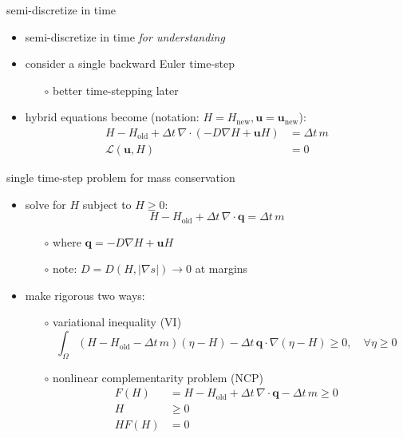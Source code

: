 \documentclass[hide notes,intlimits,usenames,dvipsnames]{beamer}
\newcommand{\Div}{\nabla\cdot}
\newcommand{\grad}{\nabla}
\begin{document}
\begin{frame}{semi-discretize in time}

\begin{itemize}
\item semi-discretize in time \emph{for understanding}
\item consider a single backward Euler time-step
    \begin{itemize}
    \item[$\circ$] better time-stepping later
    \end{itemize}
\item hybrid equations become (notation: $H=H_{\mathrm{new}}, \mathbf{u}=\mathbf{u}_{\mathrm{new}}$):
        \begin{align*}
        H - H_{\mathrm{old}} + \Delta t\, \Div (-D \grad H + \mathbf{u} H) &= \Delta t\, m \\
        \mathcal{L}(\mathbf{u},H) &= 0
        \end{align*}
\end{itemize}
\end{frame}


\begin{frame}{single time-step problem for mass conservation}

\small

\begin{itemize}
\item solve for $H$ \alert{subject to $H \ge 0$}:
        \begin{equation*}
        H - H_{\mathrm{old}} + \Delta t\, \Div \mathbf{q} = \Delta t\, m
        \end{equation*}
   \begin{itemize}

\vspace{-5mm}
   \item[$\circ$] where $\mathbf{q} = -D \grad H + \mathbf{u} H$
   \item[$\circ$] note: $D=D(H,|\grad s|) \to 0$ at margins
   \end{itemize}
\item make rigorous two ways:
    \begin{itemize}
    \item[$\circ$] variational inequality (VI)
    $$\int_\Omega (H - H_{\mathrm{old}} -\Delta t\, m) (\eta - H) - \Delta t\, \mathbf{q} \cdot \grad(\eta - H) \ge 0, \quad \forall \eta \ge 0$$
    \item[$\circ$] nonlinear complementarity problem (NCP)
\begin{align*}
F(H)   &= H - H_{\mathrm{old}} + \Delta t\,\Div \mathbf{q} - \Delta t\, m  \ge 0 \\
H      &\ge 0 \\
H F(H) &= 0
\end{align*}
    \end{itemize}
\end{itemize}
\end{frame}
\end{document}
